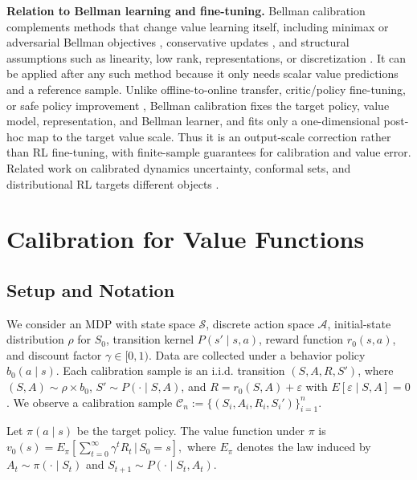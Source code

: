 \documentclass{article}
\theoremstyle{plain}
\theoremstyle{definition}
\theoremstyle{remark}
\begin{document}
\textbf{Relation to Bellman learning and fine-tuning.}
Bellman calibration complements methods that change value learning itself,
including minimax or adversarial Bellman objectives
\citep{uehara2020minimax,uehara2023offline,xie2021batch,di2023pessimistic},
conservative updates \citep{kumar2020conservative,an2021uncertainty}, and
structural assumptions such as linearity, low rank, representations, or
discretization
\citep{shah2020sample,chang2022learning,peng1993convergence,van2006performance}.
It can be applied after any such method because it only needs scalar value
predictions and a reference sample. Unlike offline-to-online transfer,
critic/policy fine-tuning, or safe policy improvement
\citep{rusu2016progressive,nair2020awac,lee2022offline,laroche2019safe},
Bellman calibration fixes the target policy, value model, representation, and
Bellman learner, and fits only a one-dimensional post-hoc map to the target
value scale. Thus it is an output-scale correction rather than RL fine-tuning,
with finite-sample guarantees for calibration and value error. Related work on
calibrated dynamics uncertainty, conformal sets, and distributional RL targets
different objects
\citep{malik2019calibrated,zhang2023conformal,sun2023conformal,
bellemare2017distributional,dabney2018implicit}.

\section{Calibration for Value Functions}
\subsection{Setup and Notation}

We consider an MDP with state space \(\mathcal S\), discrete action space
\(\mathcal A\), initial-state distribution \(\rho\) for \(S_0\), transition kernel
\(P(s'\mid s,a)\), reward function \(r_0(s,a)\), and discount factor
\(\gamma\in[0,1)\). Data are collected under a behavior policy
\(b_0(a\mid s)\). Each calibration sample is an i.i.d. transition
\((S,A,R,S')\), where \((S,A)\sim \rho\times b_0\),
\(S'\sim P(\cdot\mid S,A)\), and
\(R=r_0(S,A)+\varepsilon\) with \(E[\varepsilon\mid S,A]=0\). We observe a calibration sample
\(\mathcal C_n:=\{(S_i,A_i,R_i,S_i')\}_{i=1}^n\).

Let \(\pi(a\mid s)\) be the target policy. The value function under \(\pi\) is $v_0(s)
=
E_{\pi}[\sum_{t=0}^\infty \gamma^t R_t
\,|\, S_0=s],$ where \(E_\pi\) denotes the law induced by
\(A_t\sim\pi(\cdot\mid S_t)\) and
\(S_{t+1}\sim P(\cdot\mid S_t,A_t)\).
\end{document}
